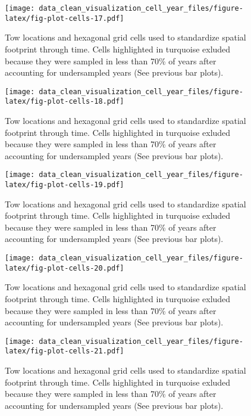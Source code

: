 \documentclass[
]{article}
\begin{document}
\begin{figure}
\centering
\texttt{[image: data\_clean\_visualization\_cell\_year\_files/figure-latex/fig-plot-cells-17.pdf]}
\caption{\label{fig:fig-plot-cells-17}Tow locations and hexagonal grid cells used to standardize spatial footprint through time. Cells highlighted in turquoise exluded because they were sampled in less than 70\% of years after accounting for undersampled years (See previous bar plots).}
\end{figure}

\begin{figure}
\centering
\texttt{[image: data\_clean\_visualization\_cell\_year\_files/figure-latex/fig-plot-cells-18.pdf]}
\caption{\label{fig:fig-plot-cells-18}Tow locations and hexagonal grid cells used to standardize spatial footprint through time. Cells highlighted in turquoise exluded because they were sampled in less than 70\% of years after accounting for undersampled years (See previous bar plots).}
\end{figure}

\begin{figure}
\centering
\texttt{[image: data\_clean\_visualization\_cell\_year\_files/figure-latex/fig-plot-cells-19.pdf]}
\caption{\label{fig:fig-plot-cells-19}Tow locations and hexagonal grid cells used to standardize spatial footprint through time. Cells highlighted in turquoise exluded because they were sampled in less than 70\% of years after accounting for undersampled years (See previous bar plots).}
\end{figure}

\begin{figure}
\centering
\texttt{[image: data\_clean\_visualization\_cell\_year\_files/figure-latex/fig-plot-cells-20.pdf]}
\caption{\label{fig:fig-plot-cells-20}Tow locations and hexagonal grid cells used to standardize spatial footprint through time. Cells highlighted in turquoise exluded because they were sampled in less than 70\% of years after accounting for undersampled years (See previous bar plots).}
\end{figure}

\begin{figure}
\centering
\texttt{[image: data\_clean\_visualization\_cell\_year\_files/figure-latex/fig-plot-cells-21.pdf]}
\caption{\label{fig:fig-plot-cells-21}Tow locations and hexagonal grid cells used to standardize spatial footprint through time. Cells highlighted in turquoise exluded because they were sampled in less than 70\% of years after accounting for undersampled years (See previous bar plots).}
\end{figure}
\end{document}
